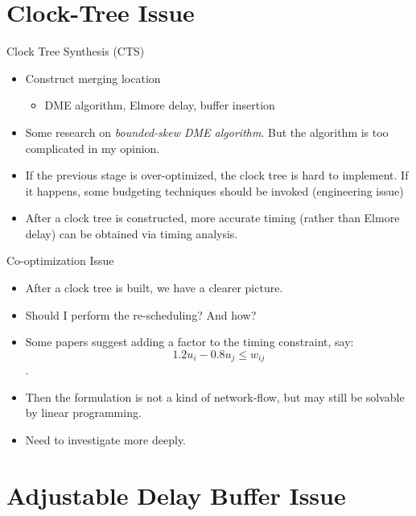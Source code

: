 \documentclass[10pt,ignorenonframetext,mathserif,onlymath]{beamer}
\providecommand{\tightlist}{%
  \setlength{\itemsep}{0pt}\setlength{\parskip}{0pt}}
\begin{document}
\hypertarget{clock-tree-issue}{%
\section{Clock-Tree Issue}\label{clock-tree-issue}}

\begin{frame}{Clock Tree Synthesis (CTS)}
\protect\hypertarget{clock-tree-synthesis-cts}{}

\begin{itemize}
\tightlist
\item
  Construct merging location

  \begin{itemize}
  \tightlist
  \item
    DME algorithm, Elmore delay, buffer insertion
  \end{itemize}
\item
  Some research on \emph{bounded-skew DME algorithm}. But the algorithm
  is too complicated in my opinion.
\item
  If the previous stage is over-optimized, the clock tree is hard to
  implement. If it happens, some budgeting techniques should be invoked
  (engineering issue)
\item
  After a clock tree is constructed, more accurate timing (rather than
  Elmore delay) can be obtained via timing analysis.
\end{itemize}

\end{frame}

\begin{frame}{Co-optimization Issue}
\protect\hypertarget{co-optimization-issue}{}

\begin{itemize}
\tightlist
\item
  After a clock tree is built, we have a clearer picture.
\item
  Should I perform the re-scheduling? And how?
\item
  Some papers suggest adding a factor to the timing constraint, say:
  \[1.2 u_i - 0.8 u_j \leq w_{ij}\].
\item
  Then the formulation is not a kind of network-flow, but may still be
  solvable by linear programming.
\item
  Need to investigate more deeply.
\end{itemize}

\end{frame}

\hypertarget{adjustable-delay-buffer-issue}{%
\section{Adjustable Delay Buffer
Issue}\label{adjustable-delay-buffer-issue}}
\end{document}
